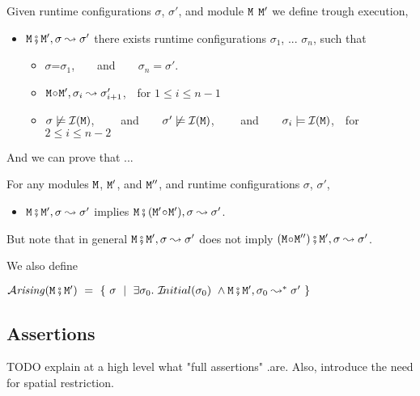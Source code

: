  
\begin{definition}
Given runtime configurations $\sigma$,  $\sigma'$,  and module $\M$ $\M'$ we define  
\label{def:module_pair_execution} trough execution,
\begin{itemize}
\item
$\M \mkpair \M', \sigma \leadsto \sigma'$ \IFF  
there exists runtime configurations $\sigma_1$,  ...
$\sigma_n$, such that 
\begin{itemize}
\item
$\sigma$=$\sigma_1$,\ \  \ \ and\ \ \ \ $\sigma_n=\sigma'$.
\item
$\M \link \M', \sigma_i \leadsto \sigma_{i+1}'$,\  \  for $1\leq i \leq n\!-\!1$
\item
$\sigma \not\models {\mathcal I}({\M})$, \ \ \ \ and\ \ \ \  $\sigma' \not\models {\mathcal I}({\M})$, \ \ \ \ and\ \ \  \
$\sigma_i \models {\mathcal I}({\M})$,\ \ for $2\leq i \leq n\!-\!2$
\end{itemize}
\end{itemize}

\end{definition}

And we can prove that ...

\begin{lemma}[xxx]
\label{lamma:module_pair_execution} 
For any modules $\M$, $\M'$, and $\M''$, and runtime configurations $\sigma$, $\sigma'$, 

\begin{itemize}
\item
 $\M \mkpair \M', \sigma \leadsto \sigma'$  implies $\M \mkpair (\M'\link\M') ,\sigma \leadsto \sigma'$.
\end{itemize}
\end{lemma} 

But note that in general $\M \mkpair \M', \sigma \leadsto \sigma'$  does not imply
$(\M\link\M'') \mkpair \M' , \sigma \leadsto \sigma'$.


We also define 
\begin{definition}
$\Arising ({\M\mkpair\M'}) \ = \ \{ \ \sigma \ \mid \ \exists \sigma_0. \  \Initial{\sigma_0} \ \wedge  \M\mkpair\M', \sigma_0 \leadsto^* \sigma' \ \} $
\end{definition}
 
 \subsection{Assertions}

TODO explain at a high level what "full assertions" .are. Also, introduce the need  for spatial restriction. 

